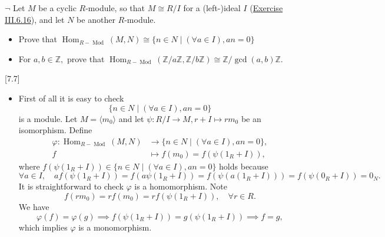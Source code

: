 \documentclass[12pt,letterpaper,boxed]{hmcpset}
\begin{document}
\hypertarget{Exercise III.6.17}{}
\begin{problem}[6.17]
	$\neg$ Let $M$ be a cyclic $R$-module, so that $M \cong R / I$ for a (left-)ideal $I$ (\hyperlink{Exercise III.6.16}{Exercise III.6.16}), and let $N$ be another $R$-module.
	\begin{itemize}
		\item Prove that $\operatorname{Hom}_{R-\operatorname{Mod}}(M, N) \cong\{n \in N \mid(\forall a \in I), a n=0\}$
		\item For $a, b \in \mathbb{Z},$ prove that $\operatorname{Hom}_{R-\operatorname{Mod}}(\mathbb{Z} / a \mathbb{Z}, \mathbb{Z} / b \mathbb{Z}) \cong \mathbb{Z} / \operatorname{gcd}(a, b) \mathbb{Z}$.
	\end{itemize}
	[7.7]
\end{problem}
\begin{solution}
	\begin{itemize}
		\item First of all it is easy to check 
		\[
		\{n \in N \mid(\forall a \in I), a n=0\}
		\]
		is a module. Let $M=\langle m_0\rangle$ and let $\psi: R / I\to M,r+I\mapsto rm_0$ be an isomorphism. Define
\begin{align*}
	\varphi:\operatorname{Hom}_{R-\operatorname{Mod}}(M, N) &\longrightarrow \{n \in N \mid(\forall a \in I), a n=0\} ,\\
	f&\longmapsto f(m_0)=f(\psi(1_R+I)),
\end{align*}
where $f(\psi(1_R+I))\in\{n \in N \mid(\forall a \in I), a n=0\}$ holds because 
\[
\forall a \in I,\quad af(\psi(1_R+I))=f(a\psi(1_R+I))=f(\psi(a(1_R+I)))=f(\psi(0_R+I))=0_N.
\]
It is straightforward to check $\varphi$ is a homomorphism. Note
\[
f(rm_0)=rf(m_0)=rf(\psi(1_R+I)),\quad \forall r\in R.
\]
We have 
\[
\varphi(f)=\varphi(g)\implies f(\psi(1_R+I))=g(\psi(1_R+I))\implies f=g,
\]
which implies $\varphi$ is a monomorphism. 


\end{itemize}
\end{solution}
\end{document}
